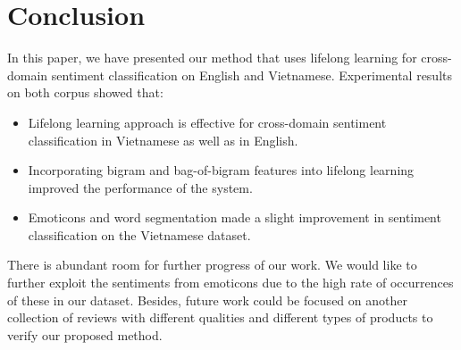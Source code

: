 \section{Conclusion}
In this paper, we have presented our method that uses lifelong learning for cross-domain sentiment classification on English and Vietnamese. 
Experimental results on both corpus showed that:
\begin{itemize}
	\item Lifelong learning approach is effective for cross-domain sentiment classification in Vietnamese as well as in English.
	\item Incorporating bigram and bag-of-bigram features into lifelong learning improved the performance of the system.
	\item Emoticons and word segmentation made a slight improvement in sentiment classification on the Vietnamese dataset.
\end{itemize}

There is abundant room for further progress of our work.
We would like to further exploit the sentiments from emoticons due to the high rate of occurrences of these in our dataset. 
Besides, future work could be focused on another collection of reviews with different qualities and different types of products to verify our proposed method.